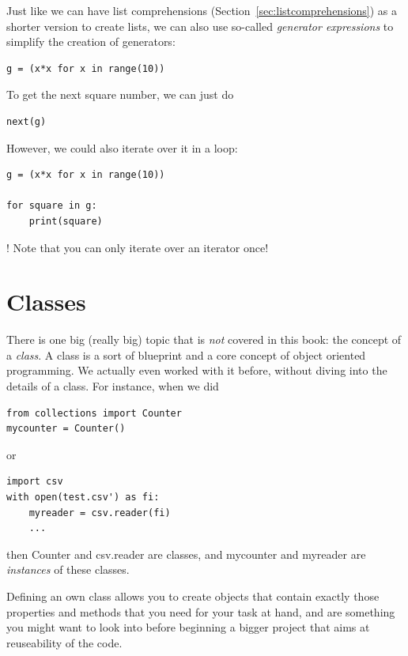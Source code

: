 \documentclass[a4paper,12pt]{book}
\let\oldquote\quote
\let\endoldquote\endquote
\renewenvironment{quote}{
\oldquote\footnotesize
\lettrine[lines=3]{\color{BrickRed}!}{ }}
{\endoldquote}
\begin{document}
\begin{appendices}
Just like we can have list comprehensions (Section~\ref{sec:listcomprehensions}) as a shorter version to create lists, we can also use so-called \emph{generator expressions} to simplify the creation of generators:

\begin{lstlisting}
g = (x*x for x in range(10))
\end{lstlisting}

To get the next square number, we can just do


\begin{lstlisting}
next(g)
\end{lstlisting}

However, we could also iterate over it in a loop:

\begin{lstlisting}
g = (x*x for x in range(10))

for square in g:
    print(square)
\end{lstlisting}



\begin{quote}
	Note that you can only iterate over an iterator once!
\end{quote}




\section{Classes}
\label{sec:classes}

There is one big (really big) topic that is \emph{not} covered in this book: the concept of a \emph{class}.
A class is a sort of blueprint and a core concept of object oriented programming. We actually even worked with it before, without diving into the details of a class. For instance, when we did
\begin{lstlisting}
from collections import Counter
mycounter = Counter()
\end{lstlisting}
or 
\begin{lstlisting}
import csv
with open(test.csv') as fi:
    myreader = csv.reader(fi)
    ...
\end{lstlisting}
then Counter and csv.reader are classes, and mycounter and myreader are \emph{instances} of these classes.

Defining an own class allows you to create objects that contain exactly those properties and methods that you need for your task at hand, and are something you might want to look into before beginning a bigger project that aims at reuseability of the code.


\end{appendices}
\end{document}
